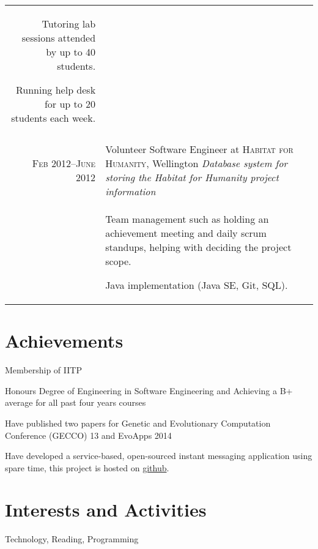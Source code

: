 \documentclass[a4paper,10pt]{article} %
\begin{document}
\begin{tabular}{r|p{11cm}}
{Tutoring lab sessions attended by up to 40 students.

Running help desk for up to 20 students each week.
}\\
\multicolumn{2}{c}{} \\


\textsc{Feb 2012–June 2012} & Volunteer Software Engineer at \textsc{Habitat for Humanity}, Wellington
 \emph{Database system for storing the Habitat for Humanity project information}\\
& \footnotesize{

Team management such as holding an achievement meeting and daily scrum standups, helping with deciding the project scope.

Java implementation (Java SE, Git, SQL).

}

\end{tabular}





\section{Achievements}

Membership of IITP

Honours Degree of Engineering in Software Engineering and Achieving a B+ average for all past four years courses

Have published two papers for Genetic and Evolutionary Computation Conference (GECCO) 13 and EvoApps 2014

Have developed a service-based, open-sourced instant messaging application using spare time, this project is hosted on \href{https://github.com/alvindaiyan/goTalk}{github}.


\section{Interests and Activities}
Technology, Reading, Programming
\end{document}
